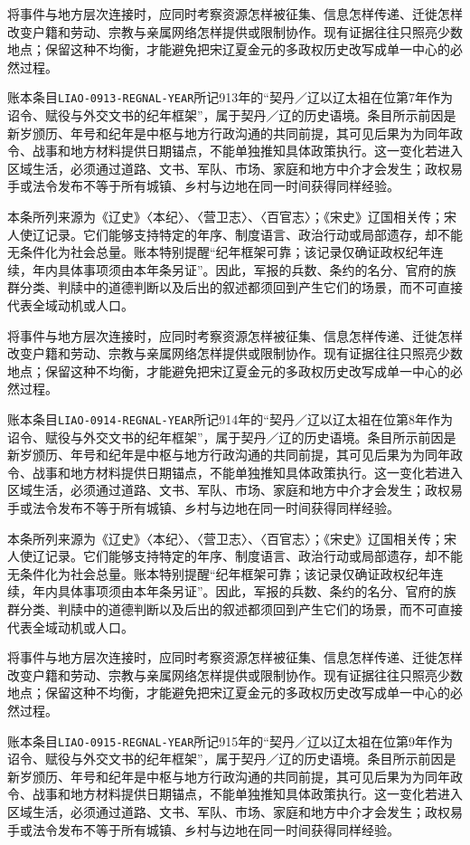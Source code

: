 将事件与地方层次连接时，应同时考察资源怎样被征集、信息怎样传递、迁徙怎样改变户籍和劳动、宗教与亲属网络怎样提供或限制协作。现有证据往往只照亮少数地点；保留这种不均衡，才能避免把宋辽夏金元的多政权历史改写成单一中心的必然过程。

账本条目\texttt{LIAO-0913-REGNAL-YEAR}所记913年的“契丹／辽以辽太祖在位第7年作为诏令、赋役与外交文书的纪年框架”，属于契丹／辽的历史语境。条目所示前因是新岁颁历、年号和纪年是中枢与地方行政沟通的共同前提，其可见后果为为同年政令、战事和地方材料提供日期锚点，不能单独推知具体政策执行。这一变化若进入区域生活，必须通过道路、文书、军队、市场、家庭和地方中介才会发生；政权易手或法令发布不等于所有城镇、乡村与边地在同一时间获得同样经验。

本条所列来源为《辽史》〈本纪〉、〈营卫志〉、〈百官志〉；《宋史》辽国相关传；宋人使辽记录。它们能够支持特定的年序、制度语言、政治行动或局部遗存，却不能无条件化为社会总量。账本特别提醒“纪年框架可靠；该记录仅确证政权纪年连续，年内具体事项须由本年条另证”。因此，军报的兵数、条约的名分、官府的族群分类、判牍中的道德判断以及后出的叙述都须回到产生它们的场景，而不可直接代表全域动机或人口。

将事件与地方层次连接时，应同时考察资源怎样被征集、信息怎样传递、迁徙怎样改变户籍和劳动、宗教与亲属网络怎样提供或限制协作。现有证据往往只照亮少数地点；保留这种不均衡，才能避免把宋辽夏金元的多政权历史改写成单一中心的必然过程。

账本条目\texttt{LIAO-0914-REGNAL-YEAR}所记914年的“契丹／辽以辽太祖在位第8年作为诏令、赋役与外交文书的纪年框架”，属于契丹／辽的历史语境。条目所示前因是新岁颁历、年号和纪年是中枢与地方行政沟通的共同前提，其可见后果为为同年政令、战事和地方材料提供日期锚点，不能单独推知具体政策执行。这一变化若进入区域生活，必须通过道路、文书、军队、市场、家庭和地方中介才会发生；政权易手或法令发布不等于所有城镇、乡村与边地在同一时间获得同样经验。

本条所列来源为《辽史》〈本纪〉、〈营卫志〉、〈百官志〉；《宋史》辽国相关传；宋人使辽记录。它们能够支持特定的年序、制度语言、政治行动或局部遗存，却不能无条件化为社会总量。账本特别提醒“纪年框架可靠；该记录仅确证政权纪年连续，年内具体事项须由本年条另证”。因此，军报的兵数、条约的名分、官府的族群分类、判牍中的道德判断以及后出的叙述都须回到产生它们的场景，而不可直接代表全域动机或人口。

将事件与地方层次连接时，应同时考察资源怎样被征集、信息怎样传递、迁徙怎样改变户籍和劳动、宗教与亲属网络怎样提供或限制协作。现有证据往往只照亮少数地点；保留这种不均衡，才能避免把宋辽夏金元的多政权历史改写成单一中心的必然过程。

账本条目\texttt{LIAO-0915-REGNAL-YEAR}所记915年的“契丹／辽以辽太祖在位第9年作为诏令、赋役与外交文书的纪年框架”，属于契丹／辽的历史语境。条目所示前因是新岁颁历、年号和纪年是中枢与地方行政沟通的共同前提，其可见后果为为同年政令、战事和地方材料提供日期锚点，不能单独推知具体政策执行。这一变化若进入区域生活，必须通过道路、文书、军队、市场、家庭和地方中介才会发生；政权易手或法令发布不等于所有城镇、乡村与边地在同一时间获得同样经验。


